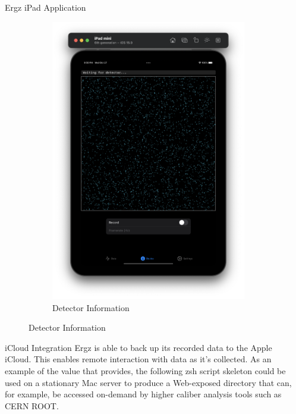 \documentclass{beamer}
\begin{document}
\begin{frame}
\begin{columns}[t]
\begin{column}{0.38\linewidth}
\begin{block}{Ergz iPad Application}
\begin{figure}
\begin{subfigure}{.5\textwidth}
            \includegraphics[width=.9\linewidth]{screen2.png}
            \caption{Detector Information}
          \end{subfigure}
        \end{figure}
      \end{block}
      \begin{block}{iCloud Integration}
        Ergz is able to back up its recorded data to the Apple iCloud. This enables remote interaction with data as it's collected. As an example of the value that provides, the following zsh script skeleton could be used on a stationary Mac server to produce a Web-exposed directory that can, for example, be accessed on-demand by higher caliber analysis tools such as CERN ROOT.
        

      \end{block}
    \end{column}
    \begin{column}{0.24\linewidth}



\end{column}
\end{columns}
\end{frame}
\end{document}
